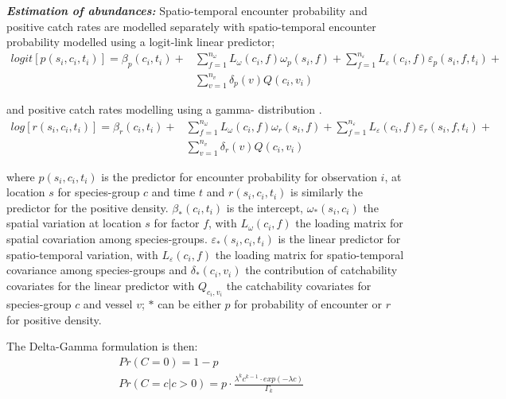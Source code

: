 \documentclass{nature}
\begin{document}
\begin{linenumbers}
\textbf{\textit{Estimation of abundances:}} Spatio-temporal encounter
probability and positive catch rates are modelled separately with
spatio-temporal encounter probability modelled using a logit-link linear
predictor;
		\begin{equation}
			\begin{split}
			logit[p(s_{i},c_{i},t_{i})] =	\beta_{p}(c_{i},t_{i}) +
			& \sum\limits_{f=1}^{n_{\omega}} L_{\omega}(c_{i},f)
			\omega_{p}(s_{i},f) + \sum\limits_{f=1}^{n_{\varepsilon}}
			L_{\varepsilon}(c_{i},f) \varepsilon_{p}(s_{i},f,t_{i}) + \\ 
			& \sum\limits_{v=1}^{n_{v}}\delta_{p}(v)Q(c_{i}, v_{i})
		\end{split}
		\end{equation}

and positive catch rates modelling using a gamma- distribution \cite{Thorson2015a}. 
		\begin{equation}
			\begin{split}
			log[r(s_{i},c_{i},t_{i})] = \beta_{r}(c_{i},t_{i}) +
			& \sum\limits_{f=1}^{n_{\omega}} L_{\omega}(c_{i},f)
			\omega_{r}(s_{i},f) +\sum\limits_{f=1}^{n_{\varepsilon}} 
			L_{\varepsilon}(c_{i},f) \varepsilon_{r}(s_{i},f,t_{i}) + \\
			& \sum\limits_{v=1}^{n_{v}}\delta_{r}(v) Q(c_{i}, v_{i})
			\end{split}
		\end{equation}

where $p(s_{i}, c_{i}, t_{i})$ is the predictor for encounter probability for
observation $i$, at location $s$ for species-group $c$ and time $t$ and
$r(s_{i}, c_{i}, t_{i})$ is similarly the predictor for the positive density.
$\beta_{*}(c_{i},t_{i})$ is the intercept, $\omega_{*}(s_{i},c_{i})$ the
spatial variation at location $s$ for factor $f$, with $L_{\omega}(c_{i},f)$
the loading matrix for spatial covariation among species-groups.
$\varepsilon_{*}(s_{i},c_{i},t_{i})$ is the linear predictor for
spatio-temporal variation, with $L_{\varepsilon}(c_{i}, f)$ the loading matrix
for spatio-temporal covariance among species-groups and $\delta_{*}(c_{i},
v_{i})$ the contribution of catchability covariates for the linear predictor
with $Q_{c_{i}, v_{i}}$ the catchability covariates for species-group $c$ and
vessel $v$;  $*$ can be either $p$ for probability of encounter or $r$ for
positive density.

The Delta-Gamma formulation is then:
\begin{equation}
	\begin{split}
	& Pr(C = 0) = 1 - p \\
	& Pr(C = c | c > 0) = p \cdot \frac{\lambda^{k}c^{k-1} \cdot exp(-\lambda c)}{\Gamma_{k}}
	\end{split}
\end{equation}


\end{linenumbers}
\end{document}
